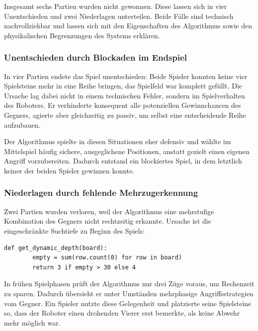 Insgesamt sechs Partien wurden nicht gewonnen. Diese lassen sich in vier Unentschieden und zwei Niederlagen unterteilen. Beide Fälle sind technisch nachvollziehbar und lassen sich mit den Eigenschaften des Algorithmus sowie den physikalischen Begrenzungen des Systems erklären.

\subsubsection{Unentschieden durch Blockaden im Endspiel}

In vier Partien endete das Spiel unentschieden: Beide Spieler konnten keine vier Spielsteine mehr in eine Reihe bringen, das Spielfeld war komplett gefüllt. Die Ursache lag dabei nicht in einem technischen Fehler, sondern im Spielverhalten des Roboters. Er verhinderte konsequent alle potenziellen Gewinnchancen des Gegners, agierte aber gleichzeitig zu passiv, um selbst eine entscheidende Reihe aufzubauen.

Der Algorithmus spielte in diesen Situationen eher defensiv und wählte im Mittelspiel häufig sichere, ausgeglichene Positionen, anstatt gezielt einen eigenen Angriff vorzubereiten. Dadurch entstand ein blockiertes Spiel, in dem letztlich keiner der beiden Spieler gewinnen konnte.

\subsubsection{Niederlagen durch fehlende Mehrzugerkennung}

Zwei Partien wurden verloren, weil der Algorithmus eine mehrstufige Kombination des Gegners nicht rechtzeitig erkannte. Ursache ist die eingeschränkte Suchtiefe zu Beginn des Spiels:
\begin{lstlisting}[style=pythonstyle]
	def get_dynamic_depth(board):
		empty = sum(row.count(0) for row in board)
		return 3 if empty > 30 else 4
\end{lstlisting}

In frühen Spielphasen prüft der Algorithmus nur drei Züge voraus, um Rechenzeit zu sparen. Dadurch übersieht er unter Umständen mehrphasige Angriffsstrategien vom Gegner. Ein Spieler nutzte diese Gelegenheit und platzierte seine Spielsteine so, dass der Roboter einen drohenden Vierer erst bemerkte, als keine Abwehr mehr möglich war.





